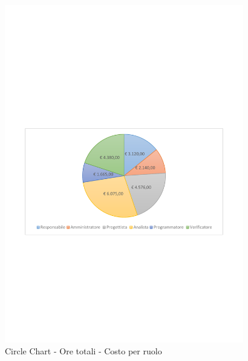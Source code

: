\documentclass[../PianoProgetto.tex]{subfiles}
\begin{document}
	\begin{figure}[!h]
		\centering
		\includegraphics[width=0.93\textwidth , trim=2cm 9.5cm 2cm 11cm]{grafici/Riepilogo/Totali/costo}
			\caption{Circle Chart - Ore totali - Costo per ruolo}
		\label{fig:CircleChart-totale_ore}
	\end{figure}
\vfill
\end{document}
